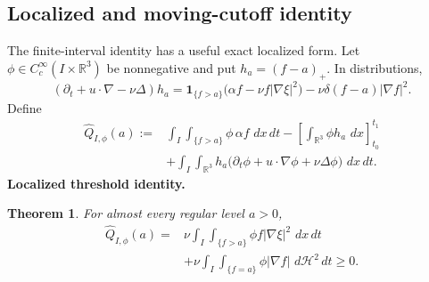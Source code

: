 \documentclass[11pt]{article}
\newtheorem{theorem}{Theorem}[section]
\theoremstyle{definition}\newtheorem{definition}[theorem]{Definition}
\theoremstyle{remark}\newtheorem{remark}[theorem]{Remark}
\newcommand{\R}{\mathbb R}\newcommand{\dd}{\,d}\newcommand{\HH}{\mathcal H}
\newcommand{\Qhat}{\widehat Q}\newcommand{\Qp}{\widehat{\mathfrak Q}}
\begin{document}
\subsection{Localized and moving-cutoff identity}
The finite-interval identity has a useful exact localized form.  Let
$\phi\in C_c^\infty(I\times\R^3)$ be nonnegative and put $h_a=(f-a)_+$.
In distributions,
\[
(\partial_t+u\cdot\nabla-\nu\Delta)h_a
=
\mathbf 1_{\{f>a\}}\bigl(\alpha f-\nu f|\nabla\xi|^2\bigr)
-\nu\delta(f-a)|\nabla f|^2.
\]
Define
\[
\begin{aligned}
\Qhat_{I,\phi}(a):={}&
\int_I\int_{\{f>a\}}\phi\,\alpha f\,\dd x\dd t
-\left[\int_{\R^3}\phi h_a\,\dd x\right]_{t_0}^{t_1}\\
&+\int_I\int_{\R^3}h_a
\bigl(\partial_t\phi+u\cdot\nabla\phi+\nu\Delta\phi\bigr)\,\dd x\dd t.
\end{aligned}
\]
\medskip
\noindent\textbf{Localized threshold identity.}
\begin{theorem}\label{thm:localized-threshold}
For almost every regular level $a>0$,
\[
\boxed{
\begin{aligned}
\Qhat_{I,\phi}(a)
={}&\nu\int_I\int_{\{f>a\}}\phi f|\nabla\xi|^2\,\dd x\dd t\\
&+\nu\int_I\int_{\{f=a\}}\phi|\nabla f|\,\dd\HH^2\dd t
\ge0.
\end{aligned}}
\]
\end{theorem}
\end{document}
